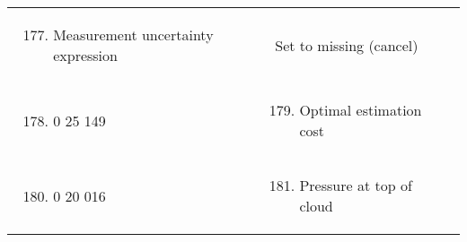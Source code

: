 \begin{longtable}[]{@{}llll@{}}
\begin{minipage}[t]{0.22\columnwidth}
\end{minipage} & \begin{minipage}[t]{0.22\columnwidth}\raggedright
\begin{enumerate}
\setcounter{enumi}{176}
\item
  Measurement uncertainty expression
\end{enumerate}\strut
\end{minipage} & \begin{minipage}[t]{0.22\columnwidth}\raggedright
Set to missing (cancel)\strut
\end{minipage}\tabularnewline
\begin{minipage}[t]{0.22\columnwidth}\raggedright
\strut
\end{minipage} & \begin{minipage}[t]{0.22\columnwidth}\raggedright
\begin{enumerate}
\setcounter{enumi}{177}
\item
  0 25 149
\end{enumerate}\strut
\end{minipage} & \begin{minipage}[t]{0.22\columnwidth}\raggedright
\begin{enumerate}
\setcounter{enumi}{178}
\item
  Optimal estimation cost
\end{enumerate}\strut
\end{minipage} & \begin{minipage}[t]{0.22\columnwidth}\raggedright
\strut
\end{minipage}\tabularnewline
\begin{minipage}[t]{0.22\columnwidth}\raggedright
\strut
\end{minipage} & \begin{minipage}[t]{0.22\columnwidth}\raggedright
\begin{enumerate}
\setcounter{enumi}{179}
\item
  0 20 016
\end{enumerate}\strut
\end{minipage} & \begin{minipage}[t]{0.22\columnwidth}\raggedright
\begin{enumerate}
\setcounter{enumi}{180}
\item
  Pressure at top of cloud
\end{enumerate}\strut
\end{minipage} & \begin{minipage}[t]{0.22\columnwidth}\raggedright

\end{minipage}
\end{longtable}
